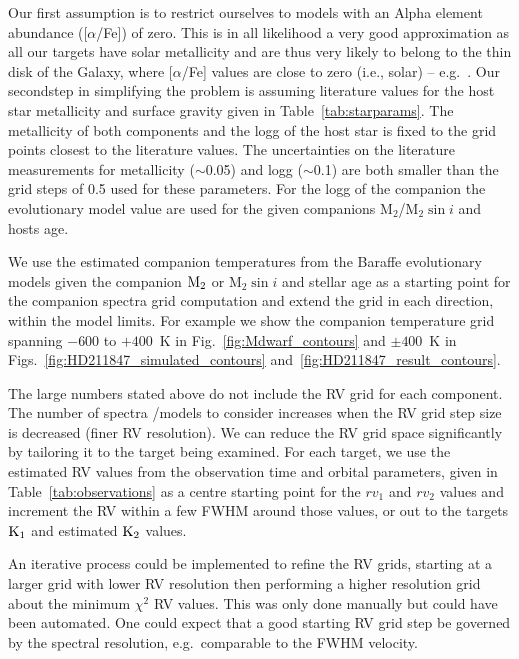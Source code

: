 \documentclass[fleqn,usenatbib]{mnras}
\newcommand*\bl{\color{blue}}
\begin{document}
    Our first assumption is to restrict ourselves to models with an Alpha element abundance ([\(\alpha\)/Fe]) of zero. This is in all likelihood a very good approximation as all our targets have solar metallicity and are thus very likely to belong to the thin disk of the Galaxy, where [\(\alpha\)/Fe] values are close to zero (i.e., solar) -- e.g.~\citet{adibekyan_chemical_2012}. Our second{\bl step in simplifying the problem is assuming literature values for the host star metallicity and surface gravity given in Table~\ref{tab:starparams}}. The metallicity of both components and the logg of the host star is fixed to the grid points closest to the literature values. The uncertainties on the literature measurements for metallicity (\(\sim\)0.05) and logg (\(\sim\)0.1) are both smaller than the grid steps of 0.5 used for these parameters.
    For the logg of the companion the~\citet{baraffe_evolutionary_2003, baraffe_new_2015} evolutionary model value are used for the given companions \(\textrm{M}_2\)/\(\textrm{M}_2\sin{i}\) and hosts age.
    
    We use the estimated companion temperatures from the Baraffe evolutionary models given the companion \(\rm M_2\) or \(\textrm{M}_2\sin{i}\) and stellar age as a starting point for the companion spectra grid computation and extend the grid in each direction, within the model limits. For example we show the companion temperature grid spanning \(-600\) to \(+400\)~K in Fig.~\ref{fig:Mdwarf_contours} and \(\pm400\)~K in Figs.~\ref{fig:HD211847_simulated_contours} and~\ref{fig:HD211847_result_contours}.
    
    The large numbers stated above do not include the RV grid for each component. The number of spectra /models to consider increases when the RV grid step size is decreased (finer RV resolution). We can reduce the RV grid space significantly by tailoring it to the target being examined. For each target, we use the estimated RV values from the observation time and orbital parameters, given in Table~\ref{tab:observations} as a centre starting point for the \({rv}_1\) and \({rv}_2\) values and increment the RV within a few FWHM around those values, or out to the targets \(\rm K_1\) and estimated \(\rm K_2\) values.
    
    An iterative process could be implemented to refine the RV grids, starting at a larger grid with lower RV resolution then performing a higher resolution grid about the minimum \(\chi^2\) RV values. This was only done manually but could have been automated. One could expect that a good starting RV grid step be governed by the spectral resolution, e.g.\ comparable to the FWHM velocity.
    
\end{document}
